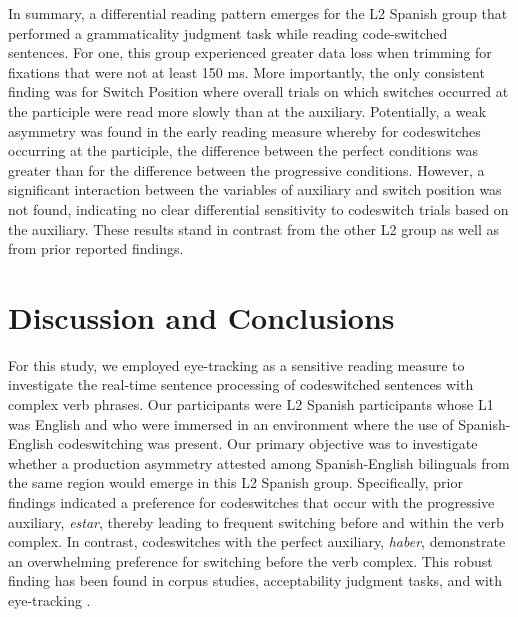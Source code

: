 \documentclass[output=paper,colorlinks,citecolor=brown]{langscibook}
\begin{document}
In summary, a differential reading pattern emerges for the L2 Spanish group that performed a grammaticality judgment task while reading code-switched sentences. For one, this group experienced greater data loss when trimming for fixations that were not at least 150 ms. More importantly, the only consistent finding was for Switch Position where overall trials on which switches occurred at the participle were read more slowly than at the auxiliary. Potentially, a weak asymmetry was found in the early reading measure whereby for codeswitches occurring at the participle, the difference between the perfect conditions was greater than for the difference between the progressive conditions. However, a significant interaction between the variables of auxiliary and switch position was not found, indicating no clear differential sensitivity to codeswitch trials based on the auxiliary. These results stand in contrast from the other L2 group as well as from prior reported findings.

\section{Discussion and Conclusions}
For this study, we employed eye-tracking as a sensitive reading measure to investigate the real-time sentence processing of codeswitched sentences with complex verb phrases. Our participants were L2 Spanish participants whose L1 was English and who were immersed in an environment where the use of Spanish-English codeswitching was present. Our primary objective was to investigate whether a production asymmetry attested among Spanish-English bilinguals from the same region would emerge in this L2 Spanish group. Specifically, prior findings indicated a preference for codeswitches that occur with the progressive auxiliary, \textit{estar}, thereby leading to frequent switching before and within the verb complex. In contrast, codeswitches with the perfect auxiliary, \textit{haber}, demonstrate an overwhelming preference for switching before the verb complex. This robust finding has been found in corpus studies, acceptability judgment tasks, and with eye-tracking \citep{GuzzardoTamargoetal2016}.
\end{document}
